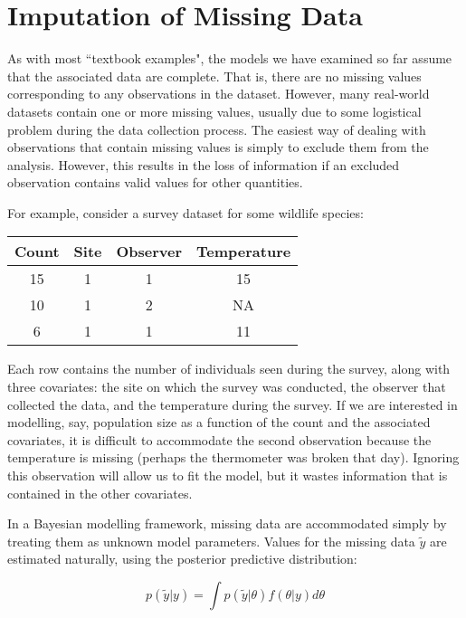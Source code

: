 \hypertarget{missing}{}
\section*{Imputation of Missing Data} %

As with most ``textbook examples", the models we have examined so far assume that the associated data are complete. That is, there are no missing values corresponding to any observations in the dataset. However, many real-world datasets contain one or more missing values, usually due to some logistical problem during the data collection process. The easiest way of dealing with observations that contain missing values is simply to exclude them from the analysis. However, this results in the loss of information if an excluded observation contains valid values for other quantities. 

For example, consider a survey dataset for some wildlife species:

\begin{center}
\begin{tabular}{cccc}
\hline
Count & Site & Observer & Temperature\\
\hline
15 & 1 & 1 & 15\\
10 & 1 & 2 & NA\\
6 & 1 & 1 & 11\\
\hline
\end{tabular}
\end{center}

Each row contains the number of individuals seen during the survey, along with three covariates: the site on which the survey was conducted, the observer that collected the data, and the temperature during the survey. If we are interested in modelling, say, population size as a function of the count and the associated covariates, it is difficult to accommodate the second observation because the temperature is missing (perhaps the thermometer was broken that day). Ignoring this observation will allow us to fit the model, but it wastes information that is contained in the other covariates. 

In a Bayesian modelling framework, missing data are accommodated simply by treating them as unknown model parameters. Values for the missing data $\tilde{y}$ are estimated naturally, using the posterior predictive distribution:

\begin{equation}
	p(\tilde{y}|y) = \int p(\tilde{y}|\theta) f(\theta|y) d\theta
\end{equation}

